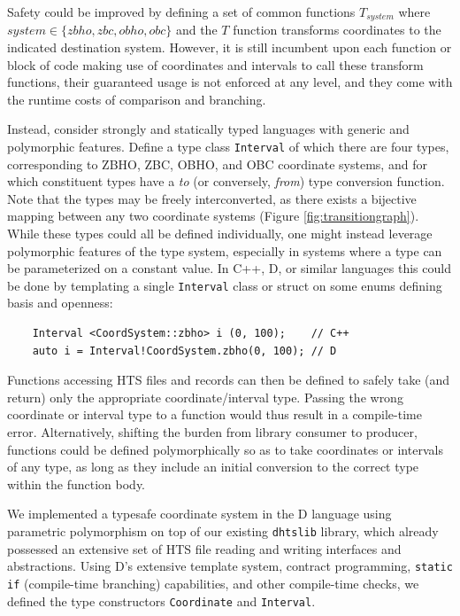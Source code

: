 \documentclass[12pt]{article}
\begin{document}
Safety could be improved by defining a set of common functions $T_{system}$ where $ system \in \{zbho, zbc, obho, obc\}$ and the $T$ function transforms coordinates to the indicated destination system. However, it is still incumbent upon each function or block of code making use of coordinates and intervals to call these transform functions, their guaranteed usage is not enforced at any level, and they come with the runtime costs of comparison and branching.

Instead, consider strongly and statically typed languages with generic and polymorphic features. Define a type class \texttt{Interval} of which there are four types, corresponding to ZBHO, ZBC, OBHO, and OBC coordinate systems, and for which constituent types have a \textit{to} (or conversely, \textit{from}) type conversion function. Note that the types may be freely interconverted, as there exists a bijective mapping between any two coordinate systems (Figure \ref{fig:transitiongraph}). While these types could all be defined individually, one might instead leverage polymorphic features of the type system, especially in systems where a type can be parameterized on a constant value. In C++, D, or similar languages this could be done by templating a single \texttt{Interval} class or struct on some enums defining basis and openness:

\begin{verbatim}
    Interval <CoordSystem::zbho> i (0, 100);    // C++
    auto i = Interval!CoordSystem.zbho(0, 100); // D
\end{verbatim}

Functions accessing HTS files and records can then be defined to safely take (and return) only the appropriate coordinate/interval type. Passing the wrong coordinate or interval type to a function would thus result in a compile-time error. Alternatively, shifting the burden from library consumer to producer, functions could be defined polymorphically so as to take coordinates or intervals of any type, as long as they include an initial conversion to the correct type within the function body.


We implemented a typesafe coordinate system in the D language using parametric polymorphism on top of our existing \texttt{dhtslib}\cite{gregory_dhtslib_nodate} library, which already possessed an extensive set of HTS file reading and writing interfaces and abstractions. Using D’s extensive template system, contract programming, \texttt{static if} (compile-time branching) capabilities, and other compile-time checks, we defined the type constructors \texttt{Coordinate} and \texttt{Interval}.
\end{document}
